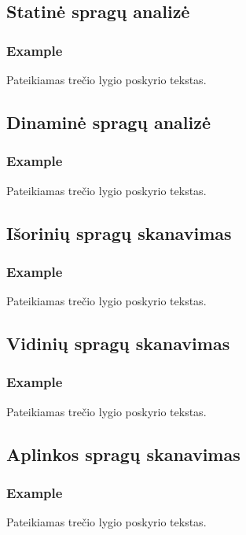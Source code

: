 \documentclass[a4paper,12pt,fleqn]{article}
\begin{document}
\subsection{Statinė spragų analizė}
\label{sec:example}

\subsubsection{Example}
\label{sec:data}
Pateikiamas trečio lygio poskyrio tekstas.

\subsection{Dinaminė spragų analizė}
\label{sec:example}

\subsubsection{Example}
\label{sec:data}
Pateikiamas trečio lygio poskyrio tekstas.

\subsection{Išorinių spragų skanavimas}
\label{sec:example}

\subsubsection{Example}
\label{sec:data}
Pateikiamas trečio lygio poskyrio tekstas.

\subsection{Vidinių spragų skanavimas}
\label{sec:example}

\subsubsection{Example}
\label{sec:data}
Pateikiamas trečio lygio poskyrio tekstas.

\subsection{Aplinkos spragų skanavimas}
\label{sec:example}

\subsubsection{Example}
\label{sec:data}
Pateikiamas trečio lygio poskyrio tekstas.
\end{document}
